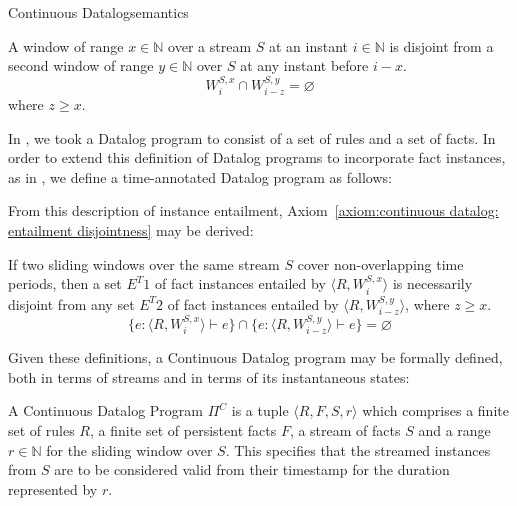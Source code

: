 \begin{nestedsection}{Continuous Datalog}{semantics}
\begin{axiom}\label{axiom:continuous datalog: window disjointness}
A window of range ${x \in \mathbb{N}}$ over a stream $S$ at an
instant ${i \in \mathbb{N}}$ is disjoint from a second window of 
range ${y \in \mathbb{N}}$ over $S$ at any instant before $i - x$.
\begin{equation*}
W^{S,x}_{i} \cap W^{S,y}_{i-z} = \varnothing
\end{equation*}
where $z \geq x$.
\end{axiom}

In , we took a Datalog
program to consist of a set of rules and a set of facts.  In order to
extend this definition of Datalog programs to incorporate fact
instances, as in , we define
a time-annotated Datalog program as follows:

From this description of instance entailment,
Axiom~\ref{axiom:continuous datalog: entailment disjointness} may be
derived:

\begin{axiom}\label{axiom:continuous datalog: entailment disjointness}
If two sliding windows over the same stream $S$ cover non-overlapping time periods,
then a set ${E^T1}$ of fact instances entailed by ${\langle R, W^{S,x}_i \rangle}$
is necessarily disjoint from any set ${E^T2}$ of fact instances entailed by
${\langle R, W^{S,y}_{i-z} \rangle}$, where ${z \geq x}$.
\[ \{ e : \langle R , W^{S,x}_i \rangle \vdash e \} \cap \{ e : \langle R , W^{S,y}_{i-z} \rangle \vdash e \} = \varnothing \]
\end{axiom}

Given these definitions, a Continuous Datalog program may be formally
defined, both in terms of streams and in terms of its instantaneous
states:

\begin{definition}\label{def:continuous datalog: CDP}
A Continuous Datalog Program $\Pi^C$ is a tuple ${\langle R, F, S, r
\rangle}$ which comprises a finite set of rules $R$, a finite set of persistent
facts $F$, a stream of facts $S$ and a range ${r \in \mathbb{N}}$ for
the sliding window over $S$. This specifies that the streamed instances from $S$ are
to be considered valid from their timestamp for the duration represented
by $r$.


\end{definition}
\end{nestedsection}
